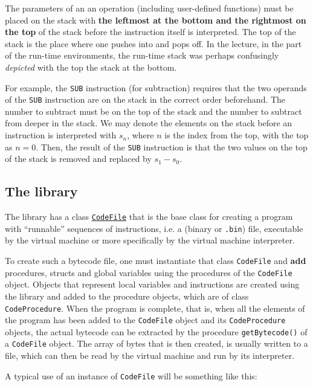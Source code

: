 \documentclass[11pt]{article}
\begin{document}
The parameters of an an operation (including user-defined functions) must
be placed on the stack with \textbf{the leftmost at the bottom and the rightmost
on the top} of the stack before the instruction itself is interpreted. The
top of the stack is the place where one pushes into and pops off. In the
lecture, in the part of the run-time environments, the run-time stack was
perhaps confusingly \emph{depicted} with the top the stack at the bottom.

For example, the \texttt{SUB} instruction (for subtraction) requires that the two
operands of the \texttt{SUB} instruction are on the stack in the correct order
beforehand. The number to subtract must be on the top of the stack and the
number to subtract from deeper in the stack. We may denote the elements on
the stack before an instruction is interpreted with \(s_n\), where \(n\) is the
index from the top, with the top as \(n = 0\). Then, the result of the \texttt{SUB}
instruction is that the two values on the top of the stack is removed and
replaced by \(s_1 - s_0\). 

\subsection{The library}
\label{sec:org14a1282}

The library has a class  \href{../../bytecode/CodeFile.java}{\texttt{CodeFile}} that is the base class for creating a
program with ``runnable'' sequences of instructions, i.e. a (binary or
\texttt{.bin}) file, executable by the virtual machine or more specifically by the
virtual machine interpreter.


To create such a bytecode file, one must instantiate that class \texttt{CodeFile}
and \textbf{add} procedures, structs and global variables using the procedures of
the \texttt{CodeFile} object. Objects that represent local variables and
instructions are created using the library and added to the procedure
objects, which are of class \texttt{CodeProcedure}. When the program is complete,
that is, when all the elements of the program has been added to the
\texttt{CodeFile} object and its \texttt{CodeProcedure} objects, the actual bytecode can
be extracted by the procedure \texttt{getBytecode()} of a \texttt{CodeFile} object.  The
array of bytes that is then created, is usually written to a file, which
can then be read by the virtual machine and run by its interpreter.



A typical use of an instance of \texttt{CodeFile} will be something like this:
\end{document}
